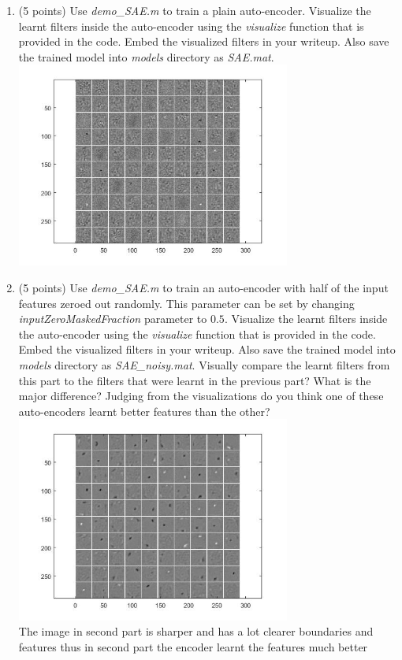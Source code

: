 \documentclass[english]{article}
\begin{document}
\begin{enumerate}
\item (5 points) Use \textit{demo\_SAE.m} to train a plain auto-encoder. Visualize the learnt filters inside the auto-encoder using the \textit{visualize} function that is provided in the code. Embed the visualized filters in your writeup. Also save the trained model into \textit{models} directory as \textit{SAE.mat}. \\
\includegraphics[width=90mm]{3_1.jpg} \\

\item (5 points) Use \textit{demo\_SAE.m} to train an auto-encoder with half of the input features zeroed out randomly. This parameter can be set by changing \textit{inputZeroMaskedFraction} parameter to $0.5$. Visualize the learnt filters inside the auto-encoder using the \textit{visualize} function that is provided in the code. Embed the visualized filters in your writeup. Also save the trained model into \textit{models} directory as \textit{SAE\_noisy.mat}. Visually compare the learnt filters from this part to the filters that were learnt in the previous part? What is the major difference? Judging from the visualizations do you think one of these auto-encoders learnt better features than the other? \\
\includegraphics[width=90mm]{3_2.jpg} \\
The image in second part is sharper and has a lot clearer boundaries and features thus in second part the encoder learnt the features much better \\



\end{enumerate}
\end{document}
